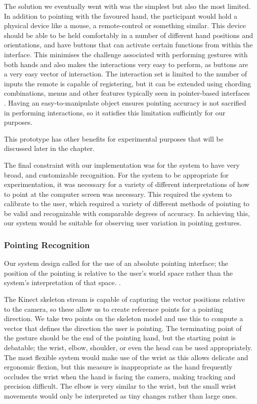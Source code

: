 The solution we eventually went with was the simplest but also the most limited. In addition to pointing with the favoured hand, the participant would hold a physical device like a mouse, a remote-control or something similar. This device should be able to be held comfortably in a number of different hand positions and orientations, and have buttons that can activate certain functions from within the interface. This minimises the challenge associated with performing gestures with both hands and also makes the interactions very easy to perform, as buttons are a very easy vector of interaction. The interaction set is limited to the number of inputs the remote is capable of registering, but it can be extended using chording combinations, menus and other features typically seen in pointer-based interfaces . Having an easy-to-manipulate object ensures pointing accuracy is not sacrified in performing interactions, so it satisfies this limitation sufficintly for our purposes.

This prototype has other benefits for experimental purposes that will be discussed later in the chapter.

The final constraint with our implementation was for the system to have very broad, and customizable recognition. For the system to be appropriate for experimentation, it was necessary for a variety of different interpretations of how to point at the computer screen was necessary. This required the system to calibrate to the user, which required a variety of different methods of pointing to be valid and recognizable with comparable degrees of accuracy. In achieving this, our system would be suitable for observing user variation in pointing gestures.

\subsubsection{Pointing Recognition}

Our system design called for the use of an absolute pointing interface; the position of the pointing is relative to the user's world space rather than the system's interpretation of that space. .

The Kinect skeleton stream is capable of capturing the vector positions relative to the camera, so these allow us to create reference points for a pointing direction. We take two points on the skeleton model and use this to compute a vector that defines the direction the user is pointing. The terminating point of the gesture should be the end of the pointing hand, but the starting point is debatable; the wrist, elbow, shoulder, or even the head can be used appropriately. The most flexible system would make use of the wrist as this allows delicate and ergonomic flexion, but this measure is inappropriate as the hand frequently occludes the wrist when the hand is facing the camera, making tracking and precision difficult. The elbow is very similar to the wrist, but the small wrist movements would only be interpreted as tiny changes rather than large ones.

